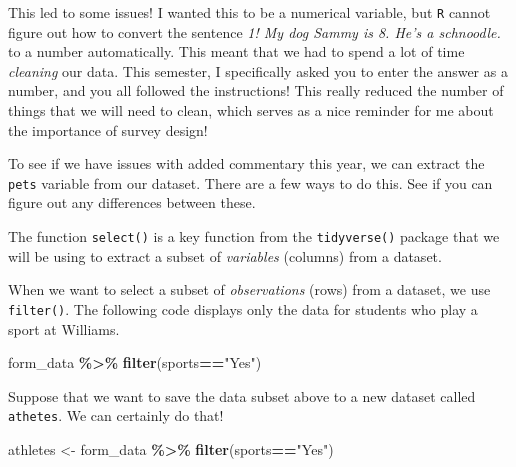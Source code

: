 \documentclass[
]{article}
\newenvironment{Shaded}{\begin{snugshade}}{\end{snugshade}}
\newcommand{\DecValTok}[1]{\textcolor[rgb]{0.00,0.00,0.81}{#1}}
\newcommand{\FunctionTok}[1]{\textcolor[rgb]{0.13,0.29,0.53}{\textbf{#1}}}
\newcommand{\NormalTok}[1]{#1}
\newcommand{\OtherTok}[1]{\textcolor[rgb]{0.56,0.35,0.01}{#1}}
\newcommand{\SpecialCharTok}[1]{\textcolor[rgb]{0.81,0.36,0.00}{\textbf{#1}}}
\newcommand{\StringTok}[1]{\textcolor[rgb]{0.31,0.60,0.02}{#1}}
\begin{document}
This led to some issues! I wanted this to be a numerical variable, but
\texttt{R} cannot figure out how to convert the sentence \emph{1! My dog
Sammy is 8. He's a schnoodle.} to a number automatically. This meant
that we had to spend a lot of time \emph{cleaning} our data. This
semester, I specifically asked you to enter the answer as a number, and
you all followed the instructions! This really reduced the number of
things that we will need to clean, which serves as a nice reminder for
me about the importance of survey design!

To see if we have issues with added commentary this year, we can extract
the \texttt{pets} variable from our dataset. There are a few ways to do
this. See if you can figure out any differences between these.

\begin{Shaded}
\end{Shaded}

The function \texttt{select()} is a key function from the
\texttt{tidyverse()} package that we will be using to extract a subset
of \emph{variables} (columns) from a dataset.

When we want to select a subset of \emph{observations} (rows) from a
dataset, we use \texttt{filter()}. The following code displays only the
data for students who play a sport at Williams.

\begin{Shaded}
\begin{Highlighting}[]
\NormalTok{form\_data }\SpecialCharTok{\%\textgreater{}\%} \FunctionTok{filter}\NormalTok{(sports}\SpecialCharTok{==}\StringTok{"Yes"}\NormalTok{)}
\end{Highlighting}
\end{Shaded}

Suppose that we want to save the data subset above to a new dataset
called \texttt{athetes}. We can certainly do that!

\begin{Shaded}
\begin{Highlighting}[]
\NormalTok{athletes }\OtherTok{\textless{}{-}}\NormalTok{ form\_data }\SpecialCharTok{\%\textgreater{}\%} \FunctionTok{filter}\NormalTok{(sports}\SpecialCharTok{==}\StringTok{"Yes"}\NormalTok{)}
\end{Highlighting}
\end{Shaded}
\end{document}
